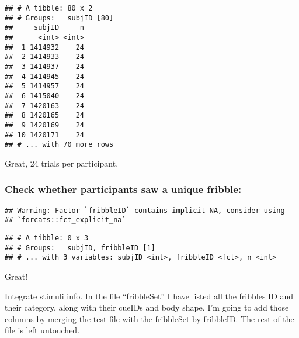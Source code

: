 \documentclass[
]{article}
\newenvironment{Shaded}{\begin{snugshade}}{\end{snugshade}}
\newcommand{\DataTypeTok}[1]{\textcolor[rgb]{0.13,0.29,0.53}{#1}}
\newcommand{\DecValTok}[1]{\textcolor[rgb]{0.00,0.00,0.81}{#1}}
\newcommand{\KeywordTok}[1]{\textcolor[rgb]{0.13,0.29,0.53}{\textbf{#1}}}
\newcommand{\NormalTok}[1]{#1}
\newcommand{\OperatorTok}[1]{\textcolor[rgb]{0.81,0.36,0.00}{\textbf{#1}}}
\newcommand{\OtherTok}[1]{\textcolor[rgb]{0.56,0.35,0.01}{#1}}
\newcommand{\StringTok}[1]{\textcolor[rgb]{0.31,0.60,0.02}{#1}}
\begin{document}
\begin{verbatim}
## # A tibble: 80 x 2
## # Groups:   subjID [80]
##     subjID     n
##      <int> <int>
##  1 1414932    24
##  2 1414933    24
##  3 1414937    24
##  4 1414945    24
##  5 1414957    24
##  6 1415040    24
##  7 1420163    24
##  8 1420165    24
##  9 1420169    24
## 10 1420171    24
## # ... with 70 more rows
\end{verbatim}

Great, 24 trials per participant.

\hypertarget{check-whether-participants-saw-a-unique-fribble}{%
\subsubsection{Check whether participants saw a unique
fribble:}\label{check-whether-participants-saw-a-unique-fribble}}

\begin{Shaded}
\end{Shaded}

\begin{verbatim}
## Warning: Factor `fribbleID` contains implicit NA, consider using
## `forcats::fct_explicit_na`
\end{verbatim}

\begin{verbatim}
## # A tibble: 0 x 3
## # Groups:   subjID, fribbleID [1]
## # ... with 3 variables: subjID <int>, fribbleID <fct>, n <int>
\end{verbatim}

Great!

Integrate stimuli info. In the file ``fribbleSet'' I have listed all the
fribbles ID and their category, along with their cueIDs and body shape.
I'm going to add those columns by merging the test file with the
fribbleSet by fribbleID. The rest of the file is left untouched.

\begin{Shaded}
\end{Shaded}
\end{document}
